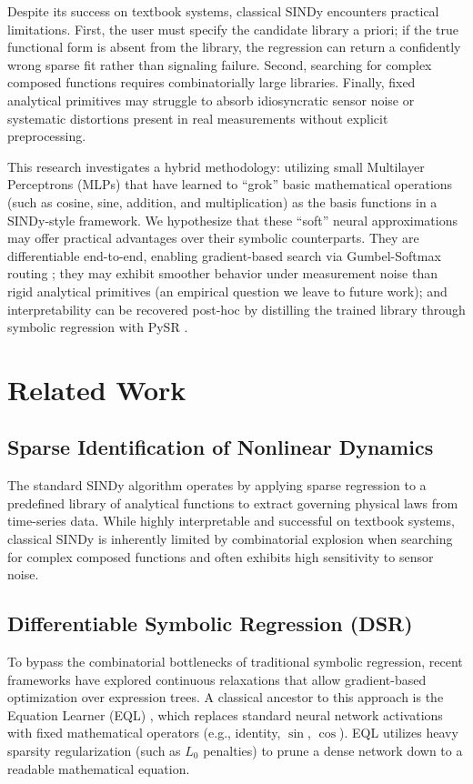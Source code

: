 \documentclass[conference]{IEEEtran}
\begin{document}
Despite its success on textbook systems, classical SINDy encounters practical limitations. First, the user must specify the candidate library a priori; if the true functional form is absent from the library, the regression can return a confidently wrong sparse fit rather than signaling failure. Second, searching for complex composed functions requires combinatorially large libraries. Finally, fixed analytical primitives may struggle to absorb idiosyncratic sensor noise or systematic distortions present in real measurements without explicit preprocessing.

This research investigates a hybrid methodology: utilizing small Multilayer Perceptrons (MLPs) that have learned to ``grok'' basic mathematical operations (such as cosine, sine, addition, and multiplication) as the basis functions in a SINDy-style framework. We hypothesize that these ``soft'' neural approximations may offer practical advantages over their symbolic counterparts. They are differentiable end-to-end, enabling gradient-based search via Gumbel-Softmax routing \cite{b7}; they may exhibit smoother behavior under measurement noise than rigid analytical primitives (an empirical question we leave to future work); and interpretability can be recovered post-hoc by distilling the trained library through symbolic regression with PySR \cite{b3}.

\section{Related Work}

\subsection{Sparse Identification of Nonlinear Dynamics}
The standard SINDy algorithm \cite{b1} operates by applying sparse regression to a predefined library of analytical functions to extract governing physical laws from time-series data. While highly interpretable and successful on textbook systems, classical SINDy is inherently limited by combinatorial explosion when searching for complex composed functions and often exhibits high sensitivity to sensor noise.

\subsection{Differentiable Symbolic Regression (DSR)}
To bypass the combinatorial bottlenecks of traditional symbolic regression, recent frameworks have explored continuous relaxations that allow gradient-based optimization over expression trees. A classical ancestor to this approach is the Equation Learner (EQL) \cite{b8}, which replaces standard neural network activations with fixed mathematical operators (e.g., identity, $\sin$, $\cos$). EQL utilizes heavy sparsity regularization (such as $L_0$ penalties) to prune a dense network down to a readable mathematical equation.
\end{document}
